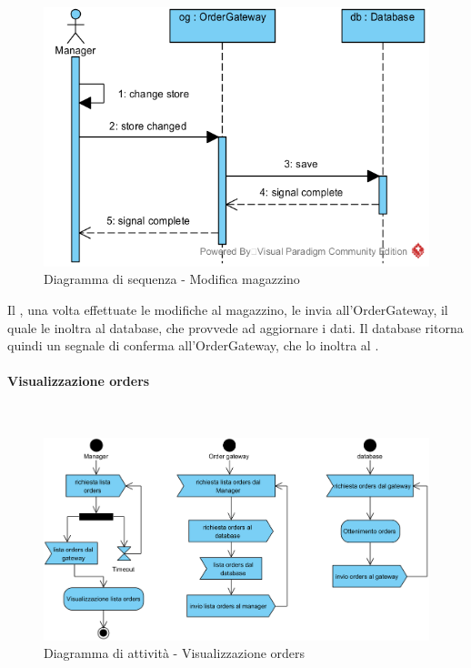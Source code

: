\begin{figure}[H]
	\centering
	\includegraphics[width=14cm]{../../documenti/SpecificaTecnica/diagrammi_img/sequenza/direttore_modifica_magazzino.png}
	\caption{Diagramma di sequenza - Modifica magazzino}
\end{figure}
Il \Manager{}, una volta effettuate le modifiche al magazzino, le invia all'Order\-Gateway, il quale le inoltra al database, che provvede ad aggiornare i dati. Il database ritorna quindi un segnale di conferma all'Order\-Gateway, che lo inoltra al \Manager{}.


\paragraph{Visualizzazione orders}\mbox{}\\
\nopagebreak
\begin{figure}[H]
	\centering
	\includegraphics[width=14cm]{diagrammi_img/attivita/manager_ordini.png}
	\caption{Diagramma di attività - Visualizzazione orders}
\end{figure}

